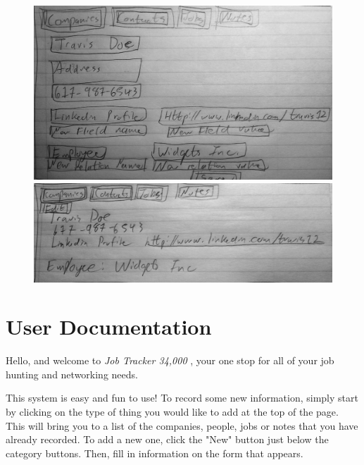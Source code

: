 \documentclass[12pt, letter]{article}
\begin{document}
\begin{figure}[H]
\begin{minipage}[t]{.4\linewidth}
\centering
\includegraphics[width=\textwidth]{story_7.jpg}
\end{minipage}
\hspace{.5cm}
\begin{minipage}[t]{.4\linewidth}
\centering
\includegraphics[width=\textwidth]{story_8.jpg}
\end{minipage}

\end{figure}

\section{User Documentation}

Hello, and welcome to \emph{Job Tracker 34,000 \texttrademark \textcopyright}, your one stop for all of your job hunting and networking needs.

\hfill

This system is easy and fun to use!  To record some new information, simply start by clicking on the type of thing you would like to add at the top of the page.  This will bring you to a list of the companies, people, jobs or notes that you have already recorded.  To add a new one, click the "New" button just below the category buttons.  Then, fill in information on the form that appears.
\end{document}
